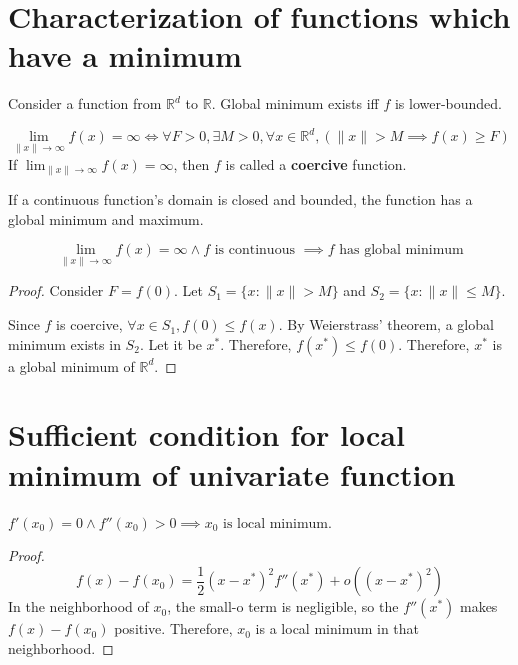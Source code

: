 \section{Characterization of functions which have a minimum}

Consider a function from $\mathbb{R}^d$ to $\mathbb{R}$.
Global minimum exists iff $f$ is lower-bounded.

\begin{definition}
\[ \lim_{\|x\| \rightarrow \infty} f(x) = \infty
\iff \forall F > 0, \exists M > 0, \forall x \in \mathbb{R}^d,
(\|x\| > M \implies f(x) \ge F) \]
If $\lim_{\|x\| \rightarrow \infty} f(x) = \infty$, then $f$ is called a \textbf{coercive} function.
\end{definition}

\begin{theorem}
If a continuous function's domain is closed and bounded,
the function has a global minimum and maximum.
\end{theorem}

\begin{theorem}
\[ \lim_{\|x\| \rightarrow \infty} f(x) = \infty \wedge f \textrm{ is continuous }
\implies f \textrm{ has global minimum} \]
\end{theorem}
\begin{proof}
Consider $F = f(0)$.
Let $S_1 = \{x: \|x\| > M \}$ and $S_2 = \{x: \|x\| \le M \}$.

Since $f$ is coercive, $\forall x \in S_1, f(0) \le f(x)$.
By Weierstrass' theorem, a global minimum exists in $S_2$. Let it be $x^*$.
Therefore, $f(x^*) \le f(0)$.
Therefore, $x^*$ is a global minimum of $\mathbb{R}^d$.
\end{proof}

\section{Sufficient condition for local minimum of univariate function}

\begin{theorem}
$f'(x_0) = 0 \wedge f''(x_0) > 0 \implies x_0 \textrm{ is local minimum}$.
\end{theorem}
\begin{proof}
\[ f(x) - f(x_0) = \frac{1}{2}(x-x^*)^2f''(x^*) + o((x-x^*)^2) \]
In the neighborhood of $x_0$, the small-o term is negligible,
so the $f''(x^*)$ makes $f(x) - f(x_0)$ positive.
Therefore, $x_0$ is a local minimum in that neighborhood.
\end{proof}

